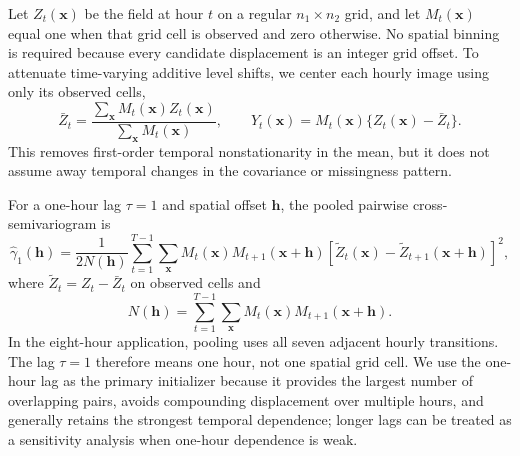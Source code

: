 Let $Z_t(\boldsymbol x)$ be the field at hour $t$ on a regular
$n_1\times n_2$ grid, and let $M_t(\boldsymbol x)$ equal one when that grid cell
is observed and zero otherwise.  No spatial binning is required because every
candidate displacement is an integer grid offset.  To attenuate time-varying
additive level shifts, we center each hourly image using only its observed
cells,
\begin{equation}
  \bar Z_t
  =\frac{\sum_{\boldsymbol x}M_t(\boldsymbol x)Z_t(\boldsymbol x)}
  {\sum_{\boldsymbol x}M_t(\boldsymbol x)},
  \qquad
  Y_t(\boldsymbol x)
  =M_t(\boldsymbol x)\{Z_t(\boldsymbol x)-\bar Z_t\}.
  \label{eq:hourly-demean}
\end{equation}
This removes first-order temporal nonstationarity in the mean, but it does not
assume away temporal changes in the covariance or missingness pattern.

For a one-hour lag $\tau=1$ and spatial offset $\boldsymbol h$, the pooled
pairwise cross-semivariogram is
\begin{equation}
  \widehat\gamma_1(\boldsymbol h)
  =\frac{1}{2N(\boldsymbol h)}
  \sum_{t=1}^{T-1}\sum_{\boldsymbol x}
  M_t(\boldsymbol x)M_{t+1}(\boldsymbol x+\boldsymbol h)
  \left[\widetilde Z_t(\boldsymbol x)
  -\widetilde Z_{t+1}(\boldsymbol x+\boldsymbol h)\right]^2,
  \label{eq:cross-semivariogram}
\end{equation}
where $\widetilde Z_t=Z_t-\bar Z_t$ on observed cells and
\begin{equation}
  N(\boldsymbol h)=\sum_{t=1}^{T-1}\sum_{\boldsymbol x}
  M_t(\boldsymbol x)M_{t+1}(\boldsymbol x+\boldsymbol h).
\end{equation}
In the eight-hour application, pooling uses all seven adjacent hourly
transitions.  The lag $\tau=1$ therefore means one hour, not one spatial grid
cell.  We use the one-hour lag as the primary initializer because it provides
the largest number of overlapping pairs, avoids compounding displacement over
multiple hours, and generally retains the strongest temporal dependence;
longer lags can be treated as a sensitivity analysis when one-hour dependence
is weak.

